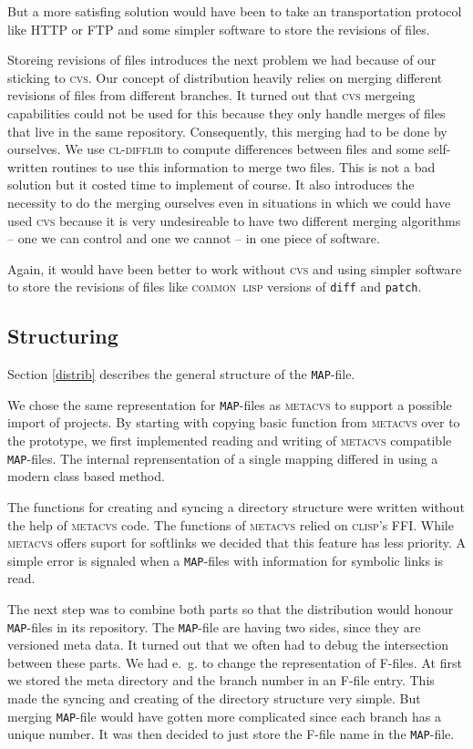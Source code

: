 \documentclass[fleqn, 10pt, a4paper]{report} \usepackage{amssymb}
\begin{document}
But a more satisfing solution would have been to take an
transportation protocol like HTTP or FTP and some simpler software to
store the revisions of files.

Storeing revisions of files introduces the next problem we had because
of our sticking to \textsc{cvs}. Our concept of distribution heavily
relies on merging different revisions of files from different
branches. It turned out that \textsc{cvs} mergeing capabilities could
not be used for this because they only handle merges of files that
live in the same repository. Consequently, this merging had to be done
by ourselves. We use \textsc{cl-difflib} \cite{Cldi06} to compute differences
between files and some self-written routines to use this information
to merge two files. This is not a bad solution but it costed time to
implement of course. It also introduces the necessity to do the
merging ourselves even in situations in which we could have used
\textsc{cvs} because it is very undesireable to have two different
merging algorithms -- one we can control and one we cannot -- in one
piece of software.

Again, it would have been better to work without \textsc{cvs} and
using simpler software to store the revisions of files like
\textsc{common~lisp} versions of \texttt{diff} and \texttt{patch}.

\subsection{Structuring} 

Section \ref{distrib} describes the general structure of the
\texttt{MAP}-file.

We chose the same representation for \texttt{MAP}-files as
\textsc{metacvs} to support a possible import of projects. By starting
with copying basic function from \textsc{metacvs} over to the
prototype, we first implemented reading and writing of
\textsc{metacvs} compatible \texttt{MAP}-files. The internal
reprensentation of a single mapping differed in using a modern class
based method.

The functions for creating and syncing a directory structure were
written without the help of \textsc{metacvs} code. The functions of
\textsc{metacvs} relied on \textsc{clisp}'s FFI. While
\textsc{metacvs} offers suport for softlinks we decided that this
feature has less priority. A simple error is signaled when a
\texttt{MAP}-files with information for symbolic links is read.

The next step was to combine both parts so that the distribution would
honour \texttt{MAP}-files in its repository. The \texttt{MAP}-file are
having two sides, since they are versioned meta data. It turned out
that we often had to debug the intersection between these parts. We
had e.~g. to change the representation of F-files. At first we stored
the meta directory and the branch number in an F-file entry. This made
the syncing and creating of the directory structure very simple.  But
merging \texttt{MAP}-file would have gotten more complicated since
each branch has a unique number. It was then decided to just store the
F-file name in the \texttt{MAP}-file.
\end{document}
